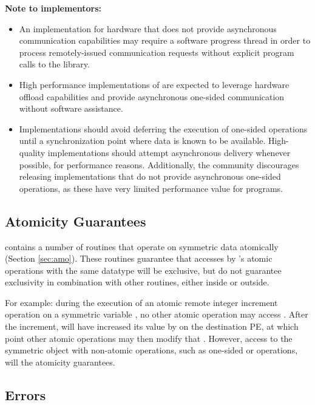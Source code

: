 \textbf{Note to implementors:}
\begin{itemize}
  \item An \openshmem implementation for hardware that does not provide
      asynchronous communication capabilities may require a software progress
      thread in order to process remotely-issued communication requests without
      explicit program calls to the \openshmem library.
  \item High performance implementations of \openshmem are expected to leverage
      hardware offload capabilities and provide asynchronous one-sided
      communication without software assistance.
  \item Implementations should avoid deferring the execution of one-sided
      operations until a synchronization point where data is known to be
      available. High-quality implementations should attempt asynchronous delivery
      whenever possible, for performance reasons. Additionally, the \openshmem
      community discourages releasing \openshmem implementations that do not
      provide asynchronous one-sided operations, as these have very limited
      performance value for \openshmem programs.
\end{itemize}

\subsection{Atomicity Guarantees}\label{subsec:amo_guarantees}

\openshmem contains a number of routines that operate on symmetric data
atomically (Section \ref{sec:amo}).  These routines guarantee that accesses by
\openshmem's atomic operations with the same datatype will be exclusive, but do not guarantee
exclusivity in combination with other routines, either inside \openshmem or
outside.

For example: during the execution of an atomic remote integer increment
operation on a symmetric variable , no other \openshmem atomic operation
may access .  After the increment,  will have increased its value
by  on the destination \ac{PE}, at which point other atomic operations
may then modify that .  However, access to the symmetric object 
with non-atomic operations, such as one-sided  or  operations,
will  the atomicity guarantees.

\subsection{Errors}\label{sec:errors}

